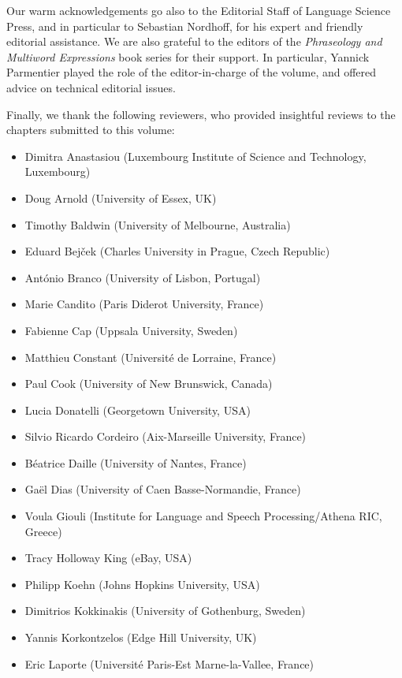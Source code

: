 \documentclass[output=paper,
modfonts,
]{langscibook}
\begin{document}
Our warm acknowledgements go also to the Editorial Staff of Language Science Press, and in particular to Sebastian Nordhoff, for his expert and friendly  editorial assistance. We are also grateful to the editors of the \emph{Phraseology and Multiword Expressions} book series for their support. In particular, Yannick Parmentier played the role of the editor-in-charge of the volume, and offered advice on technical editorial issues.

Finally, we thank the following reviewers, who provided insightful reviews to the chapters submitted to this volume:

\begin{itemize}
\item Dimitra Anastasiou (Luxembourg Institute of Science and Technology,\\ Luxembourg)
\item Doug Arnold (University of Essex, UK)
\item Timothy Baldwin (University of Melbourne, Australia)
\item Eduard Bejček (Charles University in Prague, Czech Republic)
\item António Branco (University of Lisbon, Portugal)
\item Marie Candito (Paris Diderot University, France)
\item Fabienne Cap (Uppsala University, Sweden)
\item Matthieu Constant (Université de Lorraine, France)
\item Paul Cook (University of New Brunswick, Canada)
\item Lucia Donatelli (Georgetown University, USA)
\item Silvio Ricardo Cordeiro (Aix-Marseille University, France)
\item Béatrice Daille (University of Nantes, France)
\item Gaël Dias (University of Caen Basse-Normandie, France)
\item Voula Giouli (Institute for Language and Speech Processing/Athena RIC, Greece)
\item Tracy Holloway King (eBay, USA)
\item Philipp Koehn (Johns Hopkins University, USA)
\item Dimitrios Kokkinakis (University of Gothenburg, Sweden)
\item Yannis Korkontzelos (Edge Hill University, UK)
\item Eric Laporte (Université Paris-Est Marne-la-Vallee, France)

\end{itemize}
\end{document}
